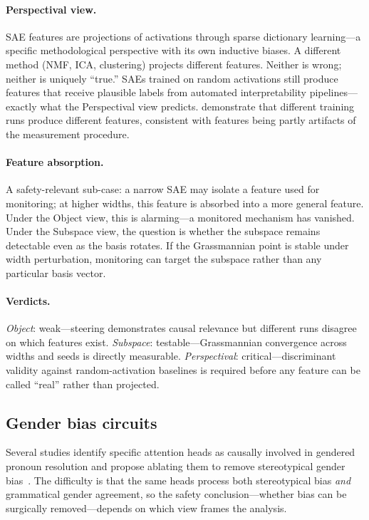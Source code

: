 \documentclass{article}
\begin{document}
\paragraph{Perspectival view.}
SAE features are projections of activations through sparse dictionary
learning---a specific methodological perspective with its own inductive
biases. A different method (NMF, ICA, clustering) projects different
features. Neither is wrong; neither is uniquely ``true.'' SAEs trained
on random activations still produce features that receive plausible
labels from automated interpretability pipelines---exactly what the
Perspectival view predicts. \citet{leask2025} demonstrate that different
training runs produce different features, consistent with features being
partly artifacts of the measurement procedure.

\paragraph{Feature absorption.}
A safety-relevant sub-case: a narrow SAE may isolate a feature used for
monitoring; at higher widths, this feature is absorbed into a more
general feature. Under the Object view, this is alarming---a monitored
mechanism has vanished. Under the Subspace view, the question is whether
the subspace remains detectable even as the basis rotates. If the
Grassmannian point is stable under width perturbation, monitoring can
target the subspace rather than any particular basis vector.

\paragraph{Verdicts.}
\emph{Object}: weak---steering demonstrates causal relevance but
different runs disagree on which features exist.
\emph{Subspace}: testable---Grassmannian convergence across widths and
seeds is directly measurable.
\emph{Perspectival}: critical---discriminant validity against
random-activation baselines is required before any feature can be called
``real'' rather than projected.


\subsection{Gender bias circuits}\label{app:cs_gender}

Several studies identify specific attention heads as causally involved in
gendered pronoun resolution and propose ablating them to remove
stereotypical gender bias~\citep{bolukbasi2016, vig2020causal}. The
difficulty is that the same heads process both stereotypical bias
\emph{and} grammatical gender agreement, so the safety
conclusion---whether bias can be surgically removed---depends on which
view frames the analysis.
\end{document}
